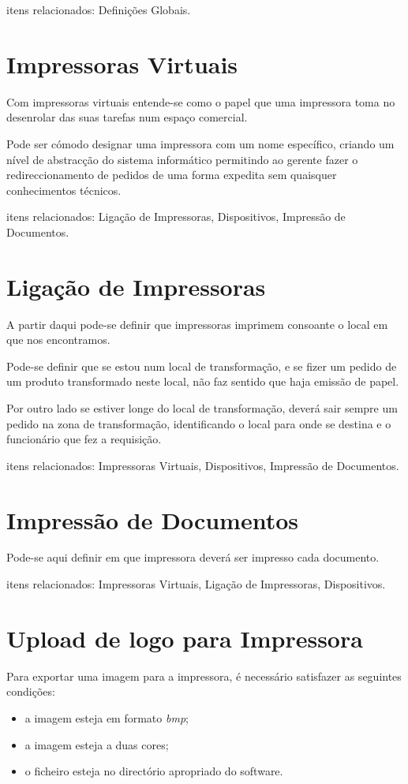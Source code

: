 \documentclass[a4paper,11pt,openany]{memoir}
\begin{document}
itens relacionados: Definições Globais.

\section{Impressoras Virtuais}

Com impressoras virtuais entende-se como o papel que uma impressora toma no desenrolar das suas tarefas num espaço comercial.

Pode ser cómodo designar uma impressora com um nome específico, criando um nível de abstracção do sistema informático
permitindo ao gerente fazer o redireccionamento de pedidos de uma forma expedita sem quaisquer conhecimentos técnicos.

itens relacionados: Ligação de Impressoras, Dispositivos, Impressão de Documentos.

\section{Ligação de Impressoras}

A partir daqui pode-se definir que impressoras imprimem consoante o local em que nos encontramos.

Pode-se definir que se estou num local de transformação, e se fizer um pedido de um produto transformado neste local,
não faz sentido que haja emissão de papel.

Por outro lado se estiver longe do local de transformação, deverá sair sempre um pedido na zona de transformação, 
identificando o local para onde se destina e o funcionário que fez a requisição.

itens relacionados: Impressoras Virtuais, Dispositivos, Impressão de Documentos.

\section{Impressão de Documentos}

Pode-se aqui definir em que impressora deverá ser impresso cada documento.

itens relacionados: Impressoras Virtuais, Ligação de Impressoras, Dispositivos.

\section{Upload de logo para Impressora}

Para exportar uma imagem para a impressora, é necessário satisfazer as seguintes condições:
\begin{itemize}
\item a imagem esteja em formato \emph{bmp};
\item a imagem  esteja a duas cores;
\item o ficheiro esteja no directório apropriado do software.
\end{itemize}
\end{document}
